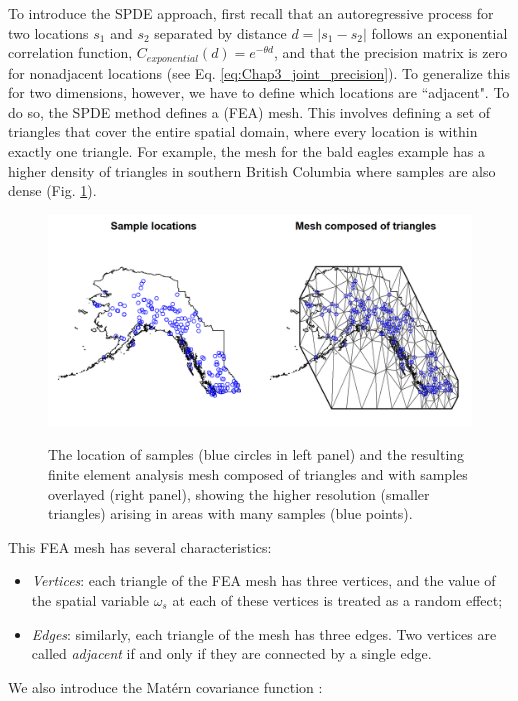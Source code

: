 To introduce the SPDE approach, first recall that an autoregressive process for two locations \(s_1\) and \(s_2\) separated by distance \(d=|s_1-s_2|\) follows an  exponential correlation function, \( C_{exponential}(d) = e^{-\theta d} \), and that the precision matrix is zero for nonadjacent locations (see Eq. \ref{eq:Chap3_joint_precision}).  To generalize this for two dimensions, however, we have to define which locations are ``adjacent".  To do so, the SPDE method defines a  (FEA) mesh.  This involves defining a set of triangles that cover the entire spatial domain, where every location is within exactly one triangle.  For example, the mesh for the bald eagles example has a higher density of triangles in southern British Columbia where samples are also dense (Fig. \ref{fig:Chap5_mesh}).  

\begin{figure}[!ht]
    \caption[Illustrating finite element mesh for bald eagle example]{The location of samples (blue circles in left panel) and the resulting finite element analysis mesh composed of triangles and with samples overlayed (right panel), showing the higher resolution (smaller triangles) arising in areas with many samples (blue points).}
    \centering
    \includegraphics[width=5.5in]{Chap_5/SPDE_mesh.png}
    \label{fig:Chap5_mesh}
\end{figure}

This FEA mesh has several characteristics:
\begin{itemize}
    \item \textit{Vertices}: each triangle of the FEA mesh has three vertices, and the value of the spatial variable \(\omega_s\) at each of these vertices is treated as a random effect;
 
    \item \textit{Edges}:  similarly, each triangle of the mesh has three edges.  Two vertices are called \textit{adjacent} if and only if they are connected by a single edge.  
\end{itemize}
We also introduce the Matérn covariance function \cite{guttorp_studies_2006}:

